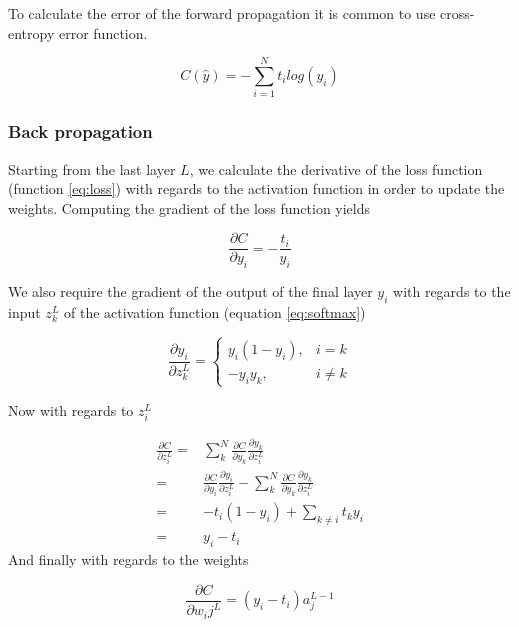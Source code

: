 \documentclass[thesis.tex]{subfiles}
\begin{document}
To calculate the error of the forward propagation it is common to use cross-entropy error function.

\begin{equation} %
  C(\hat{y}) = - \sum_{i=1}^N t_i log(y_i)
  \label{eq:loss}
\end{equation}


\subsubsection{Back propagation}
Starting from the last layer $L$, we calculate the derivative of the loss function (function \ref{eq:loss}) with regards to the activation function in order to update the weights. Computing the gradient of the loss function yields

\begin{equation}
  \frac{\partial C}{\partial y_i} = - \frac{t_i}{y_i}
\end{equation}

We also require the gradient of the output of the final layer $y_i$ with regards to the input $z_k^L$ of the activation function (equation \ref{eq:softmax})

\begin{equation}
  \frac{\partial y_i}{\partial z_k^L} = 
  \begin{cases}
      y_i(1 - y_i), & i = k\\
      -y_iy_k, & i \ne k
  \end{cases}
\end{equation}

Now with regards to $z_i^L$

\begin{equation}
  \begin{aligned}
  \frac{\partial C}{\partial z_i^L} = & \sum_k^N \frac{\partial C}{\partial y_k}\frac{\partial y_k}{\partial z_i^L} \\
  = & \frac{\partial C}{\partial y_i}\frac{\partial y_i}{\partial z_i^L} - \sum_k^N \frac{\partial C}{\partial y_k}\frac{\partial y_k}{\partial z_i^L} \\
  = & -t_i(1 - y_i) + \sum_{k \ne i}t_ky_i \\
  = & y_i - t_i
  \end{aligned}
\end{equation}
And finally with regards to the weights

\begin{equation}
   \frac{\partial C}{\partial w_ij^L} = (y_i - t_i)a_j^{L-1}
\end{equation}
\end{document}

